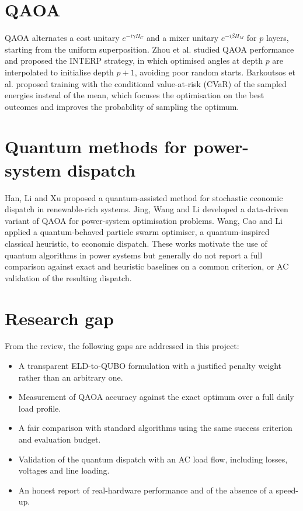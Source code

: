 \section{QAOA}
QAOA \cite{farhi2014} alternates a cost unitary $e^{-i\gamma H_C}$ and a mixer unitary $e^{-i\beta H_M}$ for $p$ layers, starting from the uniform superposition. Zhou et al. \cite{zhou2020} studied QAOA performance and proposed the INTERP strategy, in which optimised angles at depth $p$ are interpolated to initialise depth $p + 1$, avoiding poor random starts. Barkoutsos et al. \cite{barkoutsos2020} proposed training with the conditional value-at-risk (CVaR) of the sampled energies instead of the mean, which focuses the optimisation on the best outcomes and improves the probability of sampling the optimum.

\section{Quantum methods for power-system dispatch}
Han, Li and Xu \cite{han2024} proposed a quantum-assisted method for stochastic economic dispatch in renewable-rich systems. Jing, Wang and Li \cite{jing2023} developed a data-driven variant of QAOA for power-system optimisation problems. Wang, Cao and Li \cite{wang2024} applied a quantum-behaved particle swarm optimiser, a quantum-inspired classical heuristic, to economic dispatch. These works motivate the use of quantum algorithms in power systems but generally do not report a full comparison against exact and heuristic baselines on a common criterion, or AC validation of the resulting dispatch.

\section{Research gap}
From the review, the following gaps are addressed in this project:
\begin{itemize}
\item A transparent ELD-to-QUBO formulation with a justified penalty weight rather than an arbitrary one.
\item Measurement of QAOA accuracy against the exact optimum over a full daily load profile.
\item A fair comparison with standard algorithms using the same success criterion and evaluation budget.
\item Validation of the quantum dispatch with an AC load flow, including losses, voltages and line loading.
\item An honest report of real-hardware performance and of the absence of a speed-up.
\end{itemize}
